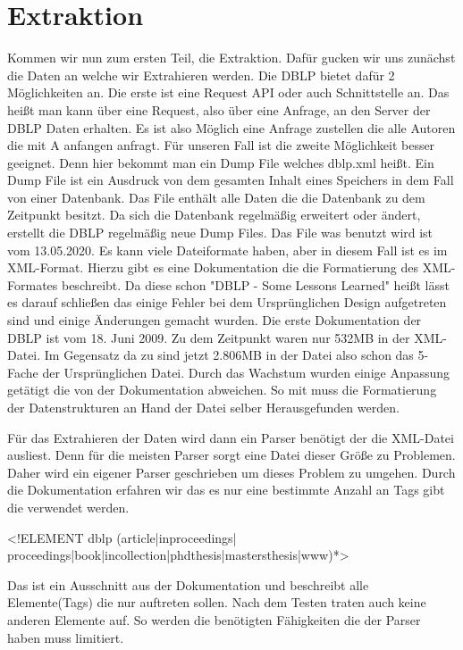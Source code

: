 \documentclass[a4paper,12pt]{article}
\begin{document}
	\section{Extraktion}
	Kommen wir nun zum ersten Teil, die Extraktion. Dafür gucken wir uns zunächst die Daten an welche wir Extrahieren werden. Die DBLP bietet dafür 2 Möglichkeiten an. Die erste ist eine Request API oder auch Schnittstelle an. Das heißt man kann über eine Request, also über eine Anfrage, an den Server der DBLP Daten erhalten. Es ist also Möglich eine Anfrage zustellen die alle Autoren die mit A anfangen anfragt. Für unseren Fall ist die zweite Möglichkeit besser geeignet. Denn hier bekommt man ein Dump File welches dblp.xml heißt. Ein Dump File ist ein Ausdruck von dem gesamten Inhalt eines Speichers in dem Fall von einer Datenbank. Das File enthält alle Daten die die Datenbank zu dem Zeitpunkt besitzt. Da sich die Datenbank regelmäßig erweitert oder ändert, erstellt die DBLP regelmäßig neue Dump Files. Das File was benutzt wird ist vom 13.05.2020. Es kann viele Dateiformate haben, aber in diesem Fall ist es im XML-Format. Hierzu gibt es eine Dokumentation die die Formatierung des XML-Formates beschreibt. Da diese schon "DBLP - Some Lessons Learned" heißt lässt es darauf schließen das einige Fehler bei dem Ursprünglichen Design aufgetreten sind und einige Änderungen gemacht wurden. Die erste Dokumentation der DBLP ist vom 18. Juni 2009. Zu dem Zeitpunkt waren nur 532MB in der XML-Datei. Im Gegensatz da zu sind jetzt 2.806MB in der Datei also schon das 5-Fache der Ursprünglichen Datei. Durch das Wachstum wurden einige Anpassung getätigt die von der Dokumentation abweichen. So mit muss die Formatierung der Datenstrukturen an Hand der Datei selber Herausgefunden werden. 
	
	Für das Extrahieren der Daten wird dann ein Parser benötigt der die XML-Datei ausliest. Denn für die meisten Parser sorgt eine Datei dieser Größe zu Problemen. Daher wird ein eigener Parser geschrieben um dieses Problem zu umgehen. Durch die Dokumentation erfahren wir das es nur eine bestimmte Anzahl an Tags gibt die verwendet werden.
	\begin{center}
		<!ELEMENT dblp (article|inproceedings| proceedings|book|incollection|phdthesis|mastersthesis|www)*>
	\end{center}
	
	Das ist ein Ausschnitt aus der Dokumentation und beschreibt alle Elemente(Tags) die nur auftreten sollen. Nach dem Testen traten auch keine anderen Elemente auf. So werden die benötigten Fähigkeiten die der Parser haben muss limitiert.
	
\end{document}
